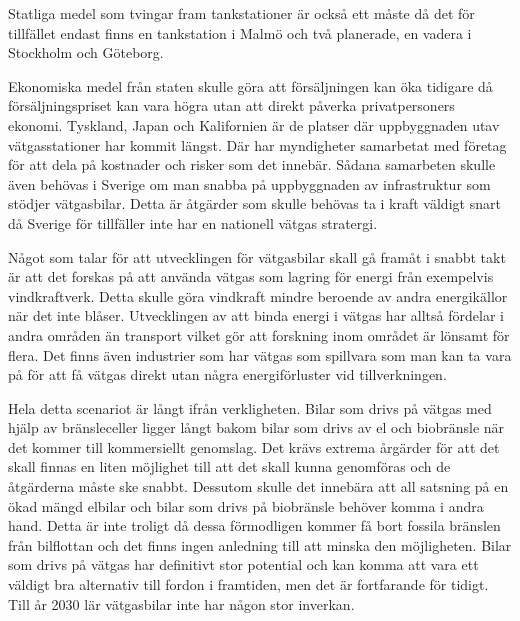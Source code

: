 \documentclass[a4paper,11pt,fleqn, titlepage]{article}
\begin{document}
Statliga medel som tvingar fram tankstationer är också ett måste då det för tillfället endast finns en tankstation i Malmö och två planerade, en vadera i Stockholm och Göteborg.

Ekonomiska medel från staten skulle göra att försäljningen kan öka tidigare då försäljningspriset kan vara högra utan att direkt påverka privatpersoners ekonomi.
Tyskland, Japan och Kalifornien är de platser där uppbyggnaden utav vätgasstationer har kommit längst. Där har myndigheter samarbetat med företag för att dela på kostnader och risker som det innebär. Sådana samarbeten skulle även behövas i Sverige om man snabba på uppbyggnaden av infrastruktur som stödjer vätgasbilar.
Detta är åtgärder som skulle behövas ta i kraft väldigt snart då Sverige för tillfäller inte har en nationell vätgas stratergi.

Något som talar för att utvecklingen för vätgasbilar skall gå framåt i snabbt takt är att det forskas på att använda vätgas som lagring för energi från exempelvis vindkraftverk. Detta skulle göra vindkraft mindre beroende av andra energikällor när det inte blåser. Utvecklingen av att binda energi i vätgas har alltså fördelar i andra områden än transport vilket gör att forskning inom området är lönsamt för flera. Det finns även industrier som har vätgas som spillvara som man kan ta vara på för att få vätgas direkt utan några energiförluster vid tillverkningen.

Hela detta scenariot är långt ifrån verkligheten. Bilar som drivs på vätgas med hjälp av bränsleceller ligger långt bakom bilar som drivs av el och biobränsle när det kommer till kommersiellt genomslag. Det krävs extrema årgärder för att det skall finnas en liten möjlighet till att det skall kunna genomföras och de åtgärderna måste ske snabbt. Dessutom skulle det innebära att all satsning på en ökad mängd elbilar och bilar som drivs på biobränsle behöver komma i andra hand. Detta är inte troligt då dessa förmodligen kommer få bort fossila bränslen från bilflottan och det finns ingen anledning till att minska den möjligheten. Bilar som drivs på vätgas har definitivt stor potential och kan komma att vara ett väldigt bra alternativ till fordon i framtiden, men det är fortfarande för tidigt. Till år 2030 lär vätgasbilar inte har någon stor inverkan.
\end{document}
